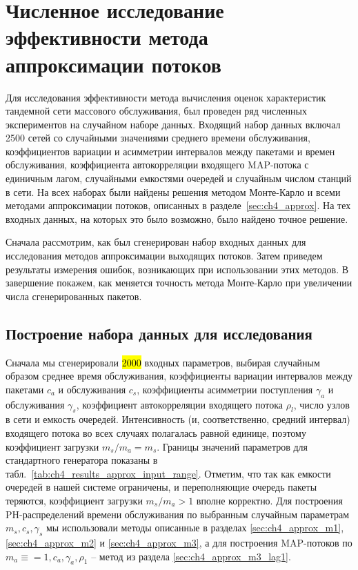 \section{Численное исследование эффективности метода аппроксимации потоков}

Для исследования эффективности метода вычисления оценок характеристик тандемной сети массового обслуживания, был проведен ряд численных экспериментов на случайном наборе данных. Входящий набор данных включал 2500 сетей со случайными значениями среднего времени обслуживания, коэффициентов вариации и асимметрии интервалов между пакетами и времен обслуживания, коэффициента автокорреляции входящего MAP-потока с единичным лагом, случайными емкостями очередей и случайным числом станций в сети. На всех наборах были найдены решения методом Монте-Карло и всеми методами аппроксимации потоков, описанных в разделе~\ref{sec:ch4_approx}. На тех входных данных, на которых это было возможно, было найдено точное решение.

Сначала рассмотрим, как был сгенерирован набор входных данных для исследования методов аппроксимации выходящих потоков. Затем приведем результаты измерения ошибок, возникающих при использовании этих методов. В завершение покажем, как меняется точность метода Монте-Карло при увеличении числа сгенерированных пакетов.


\subsection{Построение набора данных для исследования}

Сначала мы сгенерировали \hl{2000} входных параметров, выбирая случайным образом среднее время обслуживания, коэффициенты вариации интервалов между пакетами $c_a$ и обслуживания $c_s$, коэффициенты асимметрии поступления $\gamma_a$ и обслуживания $\gamma_s$, коэффициент автокорреляции входящего потока $\rho_l$, число узлов в сети и емкость очередей. Интенсивность (и, соответственно, средний интервал) входящего потока во всех случаях полагалась равной единице, поэтому коэффициент загрузки $m_s / m_a = m_s$. Границы значений параметров для стандартного генератора показаны в табл.~\ref{tab:ch4_results_approx_input_range}. Отметим, что так как емкости очередей в нашей системе ограничены, и переполняющие очередь пакеты теряются, коэффициент загрузки $m_s / m_a > 1$ вполне корректно. Для построения PH-распределений времени обслуживания по выбранным случайным параметрам $m_s, c_s, \gamma_s$ мы использовали методы описанные в разделах \ref{sec:ch4_approx_m1}, \ref{sec:ch4_approx_m2} и \ref{sec:ch4_approx_m3}, а для построения MAP-потоков по $m_a \equiv = 1, c_a, \gamma_a, \rho_1$ -- метод из раздела \ref{sec:ch4_approx_m3_lag1}.

